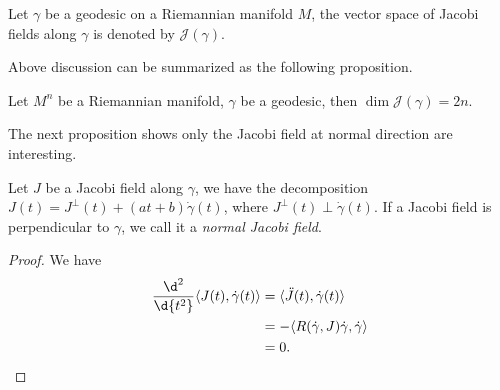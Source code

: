 \begin{symb}
    Let $\gamma$ be a geodesic on a Riemannian manifold $M$, the vector space of Jacobi fields along $\gamma$ is denoted by $\mathscr{J}(\gamma)$.
\end{symb}

Above discussion can be summarized as the following proposition.

\begin{prop}
    Let $M^n$ be a Riemannian manifold, $\gamma$ be a geodesic, then $\dim\mathscr{J}(\gamma)=2n$.
\end{prop}

The next proposition shows only the Jacobi field at normal direction are interesting.
\begin{prop}\label{decomposition of Jacobi fields}
    Let $J$ be a Jacobi field along $\gamma$, we have the decomposition $J(t)=J^\perp(t)+(at+b)\dot{\gamma}(t)$, where $J^\perp(t)\perp\dot{\gamma}(t)$.
    If a Jacobi field is perpendicular to $\gamma$, we call it a \emph{normal Jacobi field}.
\end{prop}
\begin{proof}
    We have
    \begin{align*}
        \frac{\d^2{}}{\d{t^2}}\langle J(t),\dot{\gamma}(t)\rangle&=\langle\ddot{J}(t),\dot{\gamma}(t)\rangle\\
        &=-\langle R(\dot{\gamma},J)\dot{\gamma},\dot{\gamma}\rangle\\
        &=0.\qedhere
    \end{align*}
\end{proof}

